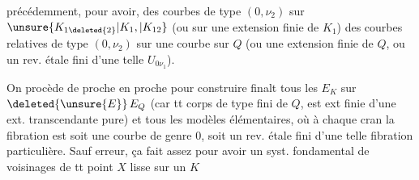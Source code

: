 précédemment, pour avoir,  des courbes de type $(0,\nu_2)$ sur $\unsure{K_{1\deleted{2}}|K_1,|K_{12}}$ (ou sur une extension finie de $K_1$)  des courbes relatives de type $(0,\nu_2)$ sur une courbe sur $Q$  (ou une extension finie de $Q$, ou un rev.  étale fini d'une telle $U_{0\nu_1}$).

On procède de proche en proche pour construire finalt tous les $E_K$ sur $\deleted{\unsure{E}}\,E_Q$ (car tt corps  de type fini de $Q$, est ext finie d'une ext. transcendante pure) et tous les modèles élémentaires, où à chaque cran la fibration est soit une courbe de genre $0$, soit un rev. étale fini d'une telle fibration particulière. Sauf erreur, ça fait assez pour avoir un syst. fondamental de voisinages de tt point  $X$ lisse sur un $K$

